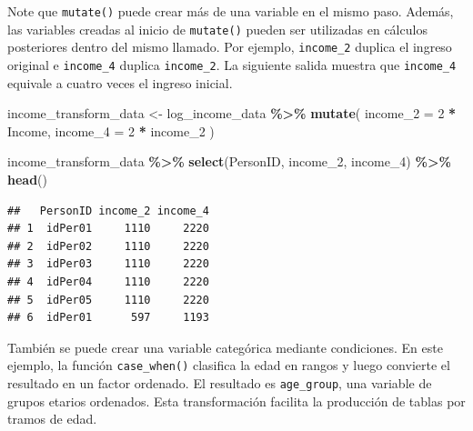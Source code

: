 \documentclass[
  spanish,
  12pt,
]{book}
\newenvironment{Shaded}{\begin{snugshade}}{\end{snugshade}}
\newcommand{\AttributeTok}[1]{\textcolor[rgb]{0.13,0.29,0.53}{#1}}
\newcommand{\DecValTok}[1]{\textcolor[rgb]{0.00,0.00,0.81}{#1}}
\newcommand{\FunctionTok}[1]{\textcolor[rgb]{0.13,0.29,0.53}{\textbf{#1}}}
\newcommand{\NormalTok}[1]{#1}
\newcommand{\OtherTok}[1]{\textcolor[rgb]{0.56,0.35,0.01}{#1}}
\newcommand{\SpecialCharTok}[1]{\textcolor[rgb]{0.81,0.36,0.00}{\textbf{#1}}}
\begin{document}
Note que \texttt{mutate()} puede crear más de una variable en el mismo paso. Además, las variables creadas al inicio de \texttt{mutate()} pueden ser utilizadas en cálculos posteriores dentro del mismo llamado. Por ejemplo, \texttt{income\_2} duplica el ingreso original e \texttt{income\_4} duplica \texttt{income\_2}. La siguiente salida muestra que \texttt{income\_4} equivale a cuatro veces el ingreso inicial.

\begin{Shaded}
\begin{Highlighting}[]
\NormalTok{income\_transform\_data }\OtherTok{\textless{}{-}}\NormalTok{ log\_income\_data }\SpecialCharTok{\%\textgreater{}\%}
  \FunctionTok{mutate}\NormalTok{(}
    \AttributeTok{income\_2 =} \DecValTok{2} \SpecialCharTok{*}\NormalTok{ Income,}
    \AttributeTok{income\_4 =} \DecValTok{2} \SpecialCharTok{*}\NormalTok{ income\_2}
\NormalTok{  )}

\NormalTok{income\_transform\_data }\SpecialCharTok{\%\textgreater{}\%}
  \FunctionTok{select}\NormalTok{(PersonID, income\_2, income\_4) }\SpecialCharTok{\%\textgreater{}\%}
  \FunctionTok{head}\NormalTok{()}
\end{Highlighting}
\end{Shaded}

\begin{verbatim}
##   PersonID income_2 income_4
## 1  idPer01     1110     2220
## 2  idPer02     1110     2220
## 3  idPer03     1110     2220
## 4  idPer04     1110     2220
## 5  idPer05     1110     2220
## 6  idPer01      597     1193
\end{verbatim}

También se puede crear una variable categórica mediante condiciones. En este ejemplo, la función \texttt{case\_when()} clasifica la edad en rangos y luego convierte el resultado en un factor ordenado. El resultado es \texttt{age\_group}, una variable de grupos etarios ordenados. Esta transformación facilita la producción de tablas por tramos de edad.
\end{document}
